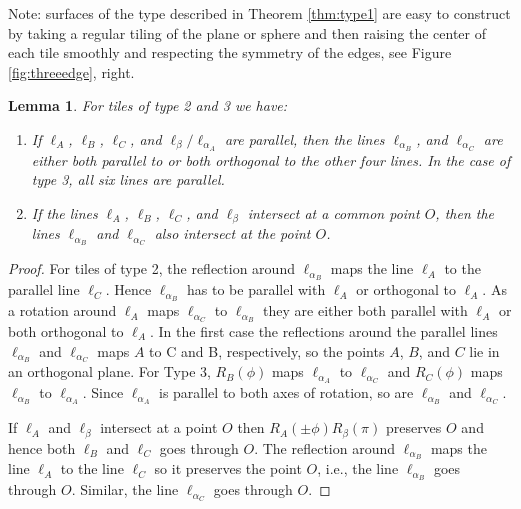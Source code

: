 \documentclass[11pt]{amsart}
\newtheorem{lemma}[theorem]{Lemma}
\theoremstyle{remark}
\newcounter{case}
\begin{document}
Note: surfaces of the type described in Theorem \ref{thm:type1} are easy to construct
by taking a regular tiling of the plane or sphere and then raising the center of each tile smoothly and
respecting the symmetry of the edges, see Figure \ref{fig:threeedge}, right.








\begin{lemma}
  \label{lemma:normals2}
  For tiles of type 2 and 3 we have:
  \begin{enumerate}
  \item If $\ell_A$, $\ell_B$, $\ell_C$, and $\ell_{\beta}/\ell_{\alpha_A}$
    are parallel, then the lines
   $\ell_{\alpha_B}$, and $\ell_{\alpha_C}$ are either both parallel to or both
   orthogonal to the other four lines.  In the case of type 3,  all six lines are parallel.
  \item If the lines $\ell_A$, $\ell_B$, $\ell_C$, and $\ell_{\beta}$
    intersect at a common point $O$, then the lines $\ell_{\alpha_B}$ and $\ell_{\alpha_C}$
    also intersect at the point $O$.
  \end{enumerate}
\end{lemma}
\begin{proof}
For tiles of type 2,  the reflection around $\ell_{\alpha_B}$ maps the line
  $\ell_A$ to the parallel line $\ell_C$. Hence $\ell_{\alpha_B}$ has
  to be parallel with $\ell_A$ or orthogonal to $\ell_A$. As a
  rotation around $\ell_A$ maps $\ell_{\alpha_C}$ to $\ell_{\alpha_B}$
  they are either both parallel with $\ell_A$ or both orthogonal to
  $\ell_A$. In the first case the reflections around the parallel
  lines $\ell_{\alpha_B}$ and $\ell_{\alpha_C}$ maps $A$ to C and B,
  respectively, so the points $A$, $B$, and $C$ lie in an orthogonal
  plane.   For Type 3, $R_B(\phi)$ maps $\ell_{\alpha_A}$ to $\ell_{\alpha_C}$ and
  $R_C(\phi)$ maps $\ell_{\alpha_B}$ to $\ell_{\alpha_A}$.  Since $\ell_{\alpha_A}$ is parallel 
  to both axes of rotation,  so are  $\ell_{\alpha_B}$ and $\ell_{\alpha_C}$.

  If $\ell_A$ and $\ell_{\beta}$ intersect at a point $O$ then
  $R_A(\pm\phi)R_{\beta}(\pi)$ preserves $O$ and hence both $\ell_B$
  and $\ell_C$ goes through $O$.
The reflection around $\ell_{\alpha_B}$ maps the
  line $\ell_A$ to the line $\ell_C$ so it preserves the point $O$,
  i.e., the line $\ell_{\alpha_B}$ goes through $O$. Similar, the line
  $\ell_{\alpha_C}$ goes through $O$.
\end{proof}
\end{document}
